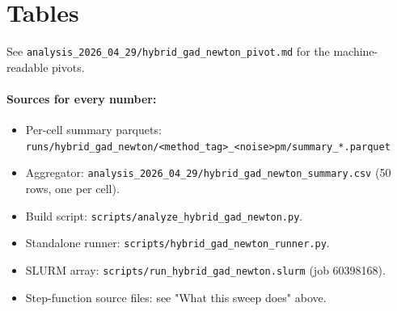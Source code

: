 \documentclass[11pt]{article}
\begin{document}
\section{Tables}

See \texttt{analysis\_2026\_04\_29/hybrid\_gad\_newton\_pivot.md} for the
machine-readable pivots.

\paragraph{Sources for every number:}
\begin{itemize}[leftmargin=1.5em, itemsep=0.05em]
\item Per-cell summary parquets:
  \texttt{runs/hybrid\_gad\_newton/<method\_tag>\_<noise>pm/summary\_*.parquet}
\item Aggregator:
  \texttt{analysis\_2026\_04\_29/hybrid\_gad\_newton\_summary.csv}
  (50 rows, one per cell).
\item Build script: \texttt{scripts/analyze\_hybrid\_gad\_newton.py}.
\item Standalone runner: \texttt{scripts/hybrid\_gad\_newton\_runner.py}.
\item SLURM array: \texttt{scripts/run\_hybrid\_gad\_newton.slurm} (job 60398168).
\item Step-function source files: see "What this sweep does" above.
\end{itemize}
\end{document}
